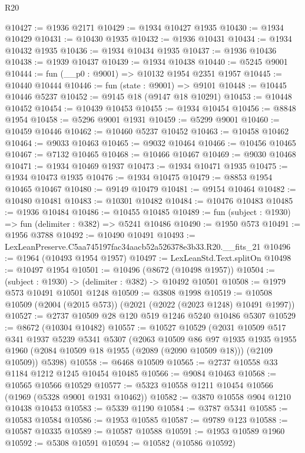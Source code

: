 \begin{lexlean}{R20}
\begin{coremodule}
@10427 := @1936 @2171
@10429 := @1934 @10427 @1935
@10430 := @1934 @10429
@10431 := @10430 @1935
@10432 := @1936 @10431
@10434 := @1934 @10432 @1935
@10436 := @1934 @10434 @1935
@10437 := @1936 @10436
@10438 := @1939 @10437
@10439 := @1934 @10438
@10440 := @5245 @9001
@10444 := fun (__p0 : @9001) => @10132 @1954 @2351 @1957
@10445 := @10440 @10444
@10446 := fun (state : @9001) => @9101
@10448 := @10445 @10446 @5237
@10452 := @9145 @18 (@9147 @18 @10291)
@10453 := @10448 @10452
@10454 := @10439 @10453
@10455 := @1934 @10454
@10456 := @8848 @1954
@10458 := @5296 @9001 @1931
@10459 := @5299 @9001
@10460 := @10459 @10446
@10462 := @10460 @5237 @10452
@10463 := @10458 @10462
@10464 := @9033 @10463
@10465 := @9032 @10464
@10466 := @10456 @10465
@10467 := @7132 @10465
@10468 := @10466 @10467
@10469 := @9030 @10468
@10471 := @1934 @10469 @1937
@10473 := @1934 @10471 @1935
@10475 := @1934 @10473 @1935
@10476 := @1934 @10475
@10479 := @8853 @1954 @10465 @10467
@10480 := @9149 @10479
@10481 := @9154 @10464
@10482 := @10480 @10481
@10483 := @10301 @10482
@10484 := @10476 @10483
@10485 := @1936 @10484
@10486 := @10455 @10485
@10489 := fun (subject : @1930) => fun (delimiter : @382) => @5241 @10486
@10490 := @1950 @573
@10491 := @1956 @3788
@10492 := @10490 @10491
@10493 := LexLeanPreserve.C5aa745197fac34aacb52a526378e3b33.R20.__fits_21
@10496 := @1964 (@10493 @1954 @1957)
@10497 := LexLeanStd.Text.splitOn
@10498 := @10497 @1954
@10501 := @10496 (@8672 (@10498 @1957))
@10504 := (subject : @1930) -> (delimiter : @382) -> @10492 @10501
@10508 := @1979 @573 @10491 @10501 @1248
@10509 := @3808 @1998
@10519 := @10508 @10509 (@2004 (@2015 @573)) (@2021 (@2022 (@2023 @1248) @10491 @1997))
@10527 := @2737 @10509 @28 @120 @519 @1246 @5240 @10486 @5307
@10529 := @8672 (@10304 @10482)
@10557 := @10527
    @10529
    (@2031
      @10509
      @517
      @341
      @1937
      @5239
      @5341
      @5307
      (@2063
        @10509
        @86
        @97
        @1935
        @1935
        @1955
        @1960
        (@2084 @10509 @18 @1955 (@2089 (@2090 @10509 @18)))
        (@2109 @10509))
      @5398)
@10558 := @6468 @10509
@10565 := @2737 @10558 @33 @1184 @1212 @1245 @10454 @10485
@10566 := @9084 @10463
@10568 := @10565 @10566 @10529
@10577 := @5323 @10558 @1211 @10454 @10566 (@1969 (@5328 @9001 @1931 @10462))
@10582 := @3870 @10558 @904 @1210 @10438 @10453
@10583 := @5339 @1190
@10584 := @3787 @5341
@10585 := @10583 @10584
@10586 := @1953 @10585
@10587 := @9789 @123
@10588 := @10587 @10335
@10589 := @10587 @10588
@10591 := @1953 @10589 @1960
@10592 := @5308 @10591
@10594 := @10582 (@10586 @10592)

\end{coremodule}
\end{lexlean}
